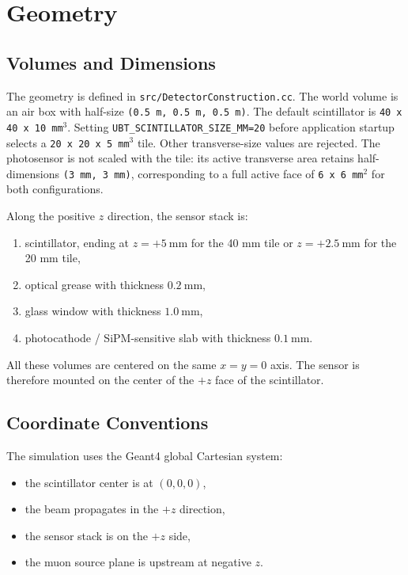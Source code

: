 \section{Geometry}
\subsection{Volumes and Dimensions}
The geometry is defined in \texttt{src/DetectorConstruction.cc}. The world volume is an air box with half-size \texttt{(0.5 m, 0.5 m, 0.5 m)}. The default scintillator is \texttt{40 x 40 x 10 mm$^{3}$}. Setting \texttt{UBT\_SCINTILLATOR\_SIZE\_MM=20} before application startup selects a \texttt{20 x 20 x 5 mm$^{3}$} tile. Other transverse-size values are rejected. The photosensor is not scaled with the tile: its active transverse area retains half-dimensions \texttt{(3 mm, 3 mm)}, corresponding to a full active face of \texttt{6 x 6 mm$^{2}$} for both configurations.

Along the positive $z$ direction, the sensor stack is:
\begin{enumerate}[label=\arabic*.]
\item scintillator, ending at $z = +5~\mathrm{mm}$ for the 40 mm tile or
$z = +2.5~\mathrm{mm}$ for the 20 mm tile,
\item optical grease with thickness $0.2~\mathrm{mm}$,
\item glass window with thickness $1.0~\mathrm{mm}$,
\item photocathode / SiPM-sensitive slab with thickness $0.1~\mathrm{mm}$.
\end{enumerate}

All these volumes are centered on the same $x=y=0$ axis. The sensor is therefore mounted on the center of the $+z$ face of the scintillator.

\subsection{Coordinate Conventions}
The simulation uses the Geant4 global Cartesian system:
\begin{itemize}
\item the scintillator center is at $(0,0,0)$,
\item the beam propagates in the $+z$ direction,
\item the sensor stack is on the $+z$ side,
\item the muon source plane is upstream at negative $z$.
\end{itemize}

